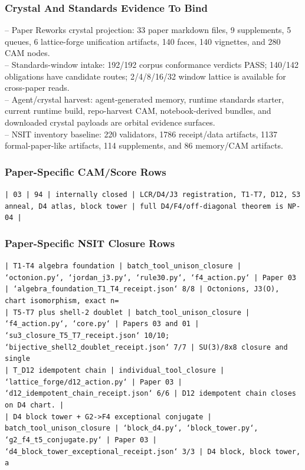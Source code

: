 \documentclass[11pt]{article}
\begin{document}
\subsubsection*{Crystal And Standards Evidence To Bind}

\noindent{}-- Paper Reworks crystal projection: 33 paper markdown files, 9 supplements, 5 queues, 6 lattice-forge unification artifacts, 140 faces, 140 vignettes, and 280 CAM nodes.\\
\noindent{}-- Standards-window intake: 192/192 corpus conformance verdicts PASS; 140/142 obligations have candidate routes; 2/4/8/16/32 window lattice is available for cross-paper reads.\\
\noindent{}-- Agent/crystal harvest: agent-generated memory, runtime standards starter, current runtime build, repo-harvest CAM, notebook-derived bundles, and downloaded crystal payloads are orbital evidence surfaces.\\
\noindent{}-- NSIT inventory baseline: 220 validators, 1786 receipt/data artifacts, 1137 formal-paper-like artifacts, 114 supplements, and 86 memory/CAM artifacts.\\

\subsubsection*{Paper-Specific CAM/Score Rows}

\noindent\texttt{| 03 | 94 | internally closed | LCR/D4/J3 registration, T1-T7, D12, S3 anneal, D4 atlas, block tower | full D4/F4/off-diagonal theorem is NP-04 |}\\

\subsubsection*{Paper-Specific NSIT Closure Rows}

\noindent\texttt{| T1-T4 algebra foundation | batch\_tool\_unison\_closure | `octonion.py`, `jordan\_j3.py`, `rule30.py`, `f4\_action.py` | Paper 03 | `algebra\_foundation\_T1\_T4\_receipt.json` 8/8 | Octonions, J3(O), chart isomorphism, exact n=}\\
\noindent\texttt{| T5-T7 plus shell-2 doublet | batch\_tool\_unison\_closure | `f4\_action.py`, `core.py` | Papers 03 and 01 | `su3\_closure\_T5\_T7\_receipt.json` 10/10; `bijective\_shell2\_doublet\_receipt.json` 7/7 | SU(3)/8x8 closure and single}\\
\noindent\texttt{| T\_D12 idempotent chain | individual\_tool\_closure | `lattice\_forge/d12\_action.py` | Paper 03 | `d12\_idempotent\_chain\_receipt.json` 6/6 | D12 idempotent chain closes on D4 chart. |}\\
\noindent\texttt{| D4 block tower + G2->F4 exceptional conjugate | batch\_tool\_unison\_closure | `block\_d4.py`, `block\_tower.py`, `g2\_f4\_t5\_conjugate.py` | Paper 03 | `d4\_block\_tower\_exceptional\_receipt.json` 3/3 | D4 block, block tower, a}\\
\end{document}
